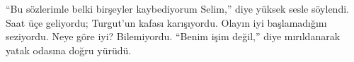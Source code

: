 \documentclass[a5paper,12pt]{scrbook}
\begin{document}
``Bu sözlerimle belki birşeyler kaybediyorum Selim,'' diye yüksek sesle söylendi.
Saat üçe geliyordu; Turgut'un kafası karışıyordu. Olayın iyi başlamadığını
seziyordu. Neye göre iyi? Bilemiyordu. ``Benim işim değil,'' diye mırıldanarak
yatak odasına doğru yürüdü.

\section*{}
\end{document}
